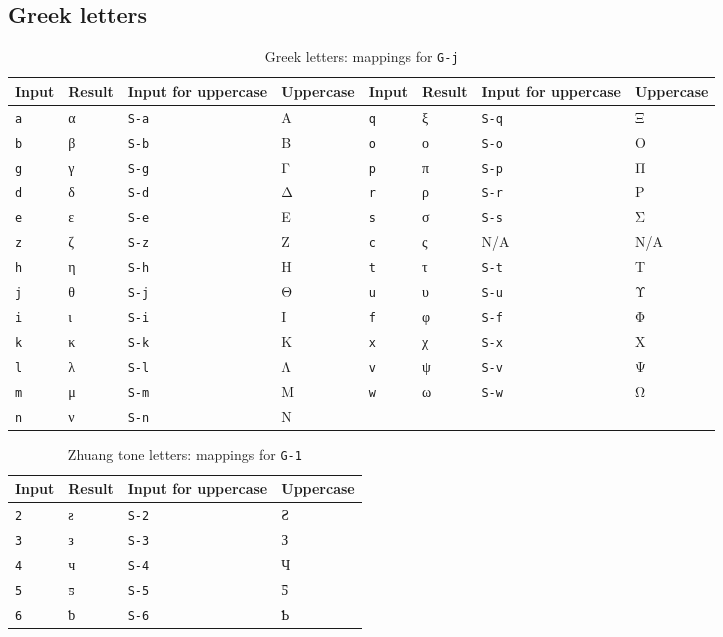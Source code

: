 \documentclass[oneside]{memoir}
\newcommand{\key}{\verb}
\newcommand{\keynv}{\texttt}
\begin{document}
\subsection{Greek letters}
\label{sec:greek_letters}

\begin{table}
\centering
\caption{Greek letters: mappings for \keynv{G-j}}
\label{tab:greek_letters}
\begin{tabular}{llllllll}
\toprule
Input & Result & Input for uppercase & Uppercase & Input & Result & Input for uppercase & Uppercase \\
\midrule
\key|a| & α & \key|S-a| & Α & \key|q| & ξ & \key|S-q| & Ξ \\
\key|b| & β & \key|S-b| & Β & \key|o| & ο & \key|S-o| & Ο \\
\key|g| & γ & \key|S-g| & Γ & \key|p| & π & \key|S-p| & Π \\
\key|d| & δ & \key|S-d| & Δ & \key|r| & ρ & \key|S-r| & Ρ \\
\key|e| & ε & \key|S-e| & Ε & \key|s| & σ & \key|S-s| & Σ \\
\key|z| & ζ & \key|S-z| & Ζ & \key|c| & ς & N/A & N/A \\
\key|h| & η & \key|S-h| & Η & \key|t| & τ & \key|S-t| & Τ \\
\key|j| & θ & \key|S-j| & Θ & \key|u| & υ & \key|S-u| & Υ \\
\key|i| & ι & \key|S-i| & Ι & \key|f| & φ & \key|S-f| & Φ \\
\key|k| & κ & \key|S-k| & Κ & \key|x| & χ & \key|S-x| & Χ \\
\key|l| & λ & \key|S-l| & Λ & \key|v| & ψ & \key|S-v| & Ψ \\
\key|m| & μ & \key|S-m| & Μ & \key|w| & ω & \key|S-w| & Ω \\
\key|n| & ν & \key|S-n| & Ν & & & & \\
\bottomrule
\end{tabular}
\end{table}

\begin{table}[b]
\centering
\caption{Zhuang tone letters: mappings for \keynv{G-1}}
\label{tab:zhuang_tones}
\centering
\begin{tabular}{llll}
\toprule
Input & Result & Input for uppercase & Uppercase \\
\midrule
\key|2| & ƨ & \key|S-2| & Ƨ \\
\key|3| & з & \key|S-3| & З \\
\key|4| & ч & \key|S-4| & Ч \\
\key|5| & ƽ & \key|S-5| & Ƽ \\
\key|6| & ƅ & \key|S-6| & Ƅ \\
\bottomrule
\end{tabular}
\end{table}
\end{document}
